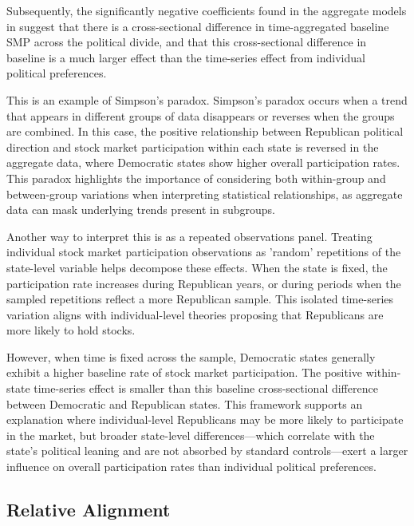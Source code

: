 Subsequently, the significantly negative coefficients found in the aggregate models in  suggest that there is a cross-sectional difference in time-aggregated baseline SMP across the political divide, and that this cross-sectional difference in baseline is a much larger effect than the time-series effect from individual political preferences.

This is an example of Simpson's paradox. Simpson's paradox occurs when a trend that appears in different groups of data disappears or reverses when the groups are combined. In this case, the positive relationship between Republican political direction and stock market participation within each state is reversed in the aggregate data, where Democratic states show higher overall participation rates. This paradox highlights the importance of considering both within-group and between-group variations when interpreting statistical relationships, as aggregate data can mask underlying trends present in subgroups.


Another way to interpret this is as a repeated observations panel. Treating individual stock market participation observations as 'random' repetitions of the state-level variable helps decompose these effects. When the state is fixed, the participation rate increases during Republican years, or during periods when the sampled repetitions reflect a more Republican sample. This isolated time-series variation aligns with individual-level theories proposing that Republicans are more likely to hold stocks.

However, when time is fixed across the sample, Democratic states generally exhibit a higher baseline rate of stock market participation. The positive within-state time-series effect is smaller than this baseline cross-sectional difference between Democratic and Republican states. This framework supports an explanation where individual-level Republicans may be more likely to participate in the market, but broader state-level differences—which correlate with the state's political leaning and are not absorbed by standard controls—exert a larger influence on overall participation rates than individual political preferences.



\subsection{Relative Alignment}
\label{sec:reconc_alg}

